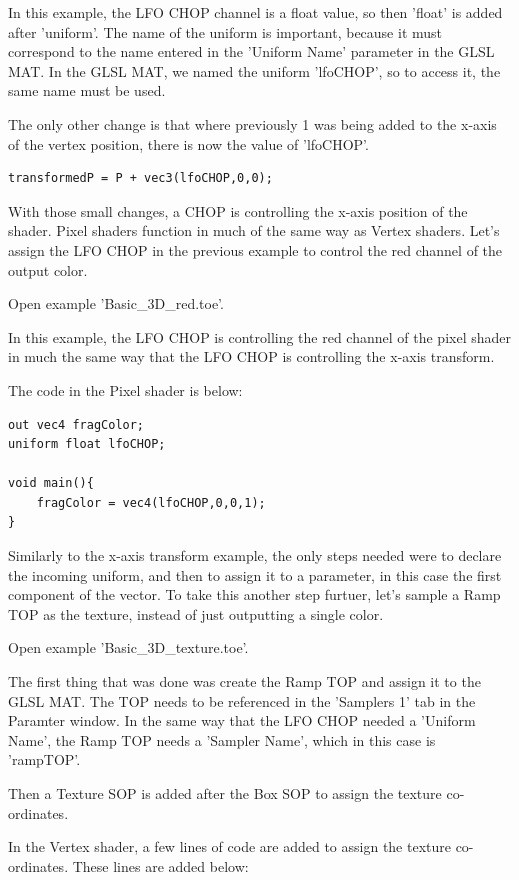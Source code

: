 \begin{fullwidth}
In this example, the LFO CHOP channel is a float value, so then 'float' is added after 'uniform'. The name of the uniform is important, because it must correspond to the name entered in the 'Uniform Name' parameter in the GLSL MAT. In the GLSL MAT, we named the uniform 'lfoCHOP', so to access it, the same name must be used.

The only other change is that where previously 1 was being added to the x-axis of the vertex position, there is now the value of 'lfoCHOP'.

\begin{lstlisting}
transformedP = P + vec3(lfoCHOP,0,0);
\end{lstlisting}

With those small changes, a CHOP is controlling the x-axis position of the shader. Pixel shaders function in much of the same way as Vertex shaders. Let's assign the LFO CHOP in the previous example to control the red channel of the output color. 

Open example 'Basic\_3D\_red.toe'.

In this example, the LFO CHOP is controlling the red channel of the pixel shader in much the same way that the LFO CHOP is controlling the x-axis transform.

The code in the Pixel shader is below:

\begin{lstlisting}
out vec4 fragColor;
uniform float lfoCHOP;

void main(){
	fragColor = vec4(lfoCHOP,0,0,1);
}
\end{lstlisting}

Similarly to the x-axis transform example, the only steps needed were to declare the incoming uniform, and then to assign it to a parameter, in this case the first component of the vector. To take this another step furtuer, let's sample a Ramp TOP as the texture, instead of just outputting a single color. 

Open example 'Basic\_3D\_texture.toe'.

The first thing that was done was create the Ramp TOP and assign it to the GLSL MAT. The TOP needs to be referenced in the 'Samplers 1' tab in the Paramter window. In the same way that the LFO CHOP needed a 'Uniform Name', the Ramp TOP needs a 'Sampler Name', which in this case is 'rampTOP'.

Then a Texture SOP is added after the Box SOP to assign the texture co-ordinates.

In the Vertex shader, a few lines of code are added to assign the texture co-ordinates. These lines are added below:



\end{fullwidth}

